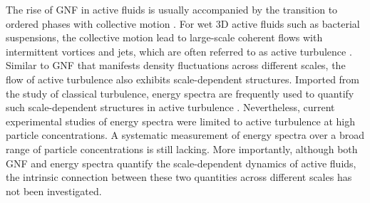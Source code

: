 \documentclass[twocolumn,aps,prx,amsmath,amssymb,longbibliography]{revtex4-2}
\begin{document}

The rise of GNF in active fluids is usually accompanied by the transition to ordered phases with collective motion \cite{Ramaswamy2010,Marchetti2013}. For wet 3D active fluids such as bacterial suspensions, the collective motion lead to large-scale coherent flows with intermittent vortices and jets, which are often referred to as active turbulence \cite{Wolgemuth2008,Wensink2012,Dunkel2013a,Bratanov2015,Guo2018,Linkmann2019,Bardfalvy2019,Alert2020,Skultety2020,Peng2020}. Similar to GNF that manifests density fluctuations across different scales, the flow of active turbulence also exhibits scale-dependent structures. Imported from the study of classical turbulence, energy spectra are frequently used to quantify such scale-dependent structures in active turbulence \cite{Ishikawa2011,Wensink2012,Dunkel2013a,Giomi2015,Creppy2015,Patteson2018,Alert2020}. Nevertheless, current experimental studies of energy spectra were limited to active turbulence at high particle concentrations. A systematic measurement of energy spectra over a broad range of particle concentrations is still lacking. More importantly, although both GNF and energy spectra quantify the scale-dependent dynamics of active fluids, the intrinsic connection between these two quantities across different scales has not been investigated.
\end{document}
